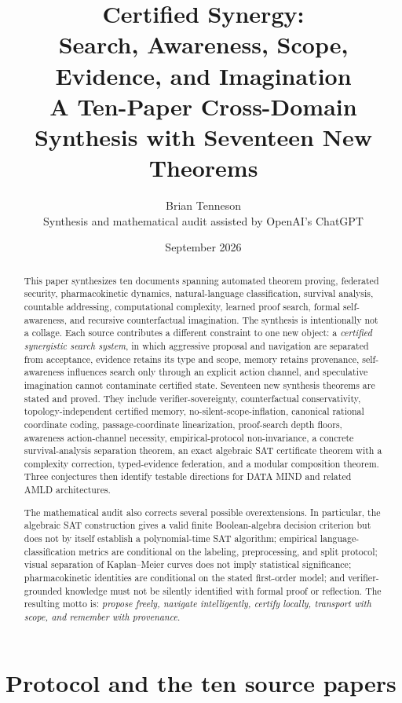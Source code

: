 \documentclass[11pt]{article}
\title{\bfseries Certified Synergy:\\Search, Awareness, Scope, Evidence, and Imagination\\\large A Ten-Paper Cross-Domain Synthesis with Seventeen New Theorems}
\author{Brian Tenneson\\Synthesis and mathematical audit assisted by OpenAI's ChatGPT}
\date{September 2026}
\theoremstyle{special}
\theoremstyle{definition}
\begin{document}
\maketitle

\begin{abstract}
This paper synthesizes ten documents spanning automated theorem proving, federated security, pharmacokinetic dynamics, natural-language classification, survival analysis, countable addressing, computational complexity, learned proof search, formal self-awareness, and recursive counterfactual imagination. The synthesis is intentionally not a collage. Each source contributes a different constraint to one new object: a \emph{certified synergistic search system}, in which aggressive proposal and navigation are separated from acceptance, evidence retains its type and scope, memory retains provenance, self-awareness influences search only through an explicit action channel, and speculative imagination cannot contaminate certified state. Seventeen new synthesis theorems are stated and proved. They include verifier-sovereignty, counterfactual conservativity, topology-independent certified memory, no-silent-scope-inflation, canonical rational coordinate coding, passage-coordinate linearization, proof-search depth floors, awareness action-channel necessity, empirical-protocol non-invariance, a concrete survival-analysis separation theorem, an exact algebraic SAT certificate theorem with a complexity correction, typed-evidence federation, and a modular composition theorem. Three conjectures then identify testable directions for DATA MIND and related AMLD architectures.

The mathematical audit also corrects several possible overextensions. In particular, the algebraic SAT construction gives a valid finite Boolean-algebra decision criterion but does not by itself establish a polynomial-time SAT algorithm; empirical language-classification metrics are conditional on the labeling, preprocessing, and split protocol; visual separation of Kaplan--Meier curves does not imply statistical significance; pharmacokinetic identities are conditional on the stated first-order model; and verifier-grounded knowledge must not be silently identified with formal proof or reflection. The resulting motto is: \emph{propose freely, navigate intelligently, certify locally, transport with scope, and remember with provenance}.
\end{abstract}

\tableofcontents
\newpage

\section{Protocol and the ten source papers}
\end{document}
